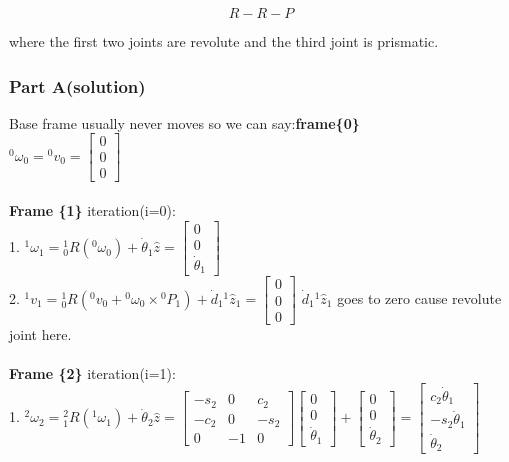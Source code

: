 \documentclass{article}
\begin{document}
\[
\boxed{R-R-P}
\]

where the first two joints are revolute and the third joint is
prismatic.


\subsubsection{Part A(solution)}
Base frame usually never moves so we can say:\textbf{frame\{0\}}\\
${}^0\omega_0={}^0v_0=\begin{bmatrix}
0\\
0\\
0
\end{bmatrix}$\\\\
\textbf{Frame \{1\}} iteration(i=0):\\
1. ${}^1 \omega_1 = {}^1_0R ({}^0 \omega_0) + \dot{\theta}_1 \hat{z} = \begin{bmatrix}
    0\\
    0\\
    \dot{\theta}_1
\end{bmatrix}$\\
2. ${}^{1}v_{1}={}^{1}_0R({}^0 v_0 + {}^0 \omega_0 \times {}^0 P_{1}) + \dot{d}_{1} {}^{1}\hat{z}_{1}=\begin{bmatrix}
    0\\
    0\\
    0
\end{bmatrix}$ $\dot{d}_{1} {}^{1}\hat{z}_{1}$ goes to zero cause revolute joint here.\\\\
\textbf{Frame \{2\}} iteration(i=1):\\
1. ${}^2 \omega_2 = {}^2_1R ({}^1 \omega_1) + \dot{\theta}_2 \hat{z} =\begin{bmatrix}
-s_2 & 0 & c_2\\
-c_2 & 0 & -s_2\\
0 & -1 & 0
\end{bmatrix} \begin{bmatrix}
    0\\
    0\\
    \dot{\theta}_1
\end{bmatrix} + \begin{bmatrix}
0\\
0\\
\dot{\theta}_2
\end{bmatrix} = \begin{bmatrix}
    c_2\dot{\theta}_1\\
    -s_2\dot{\theta}_1\\
    \dot{\theta}_2
\end{bmatrix}$\\
\end{document}
